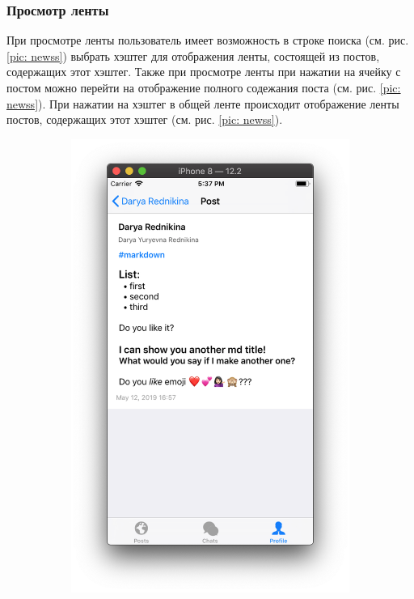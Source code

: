 \documentclass[a4paper,12pt]{article}
\begin{document}
	\subsubsection{Просмотр ленты}
	При просмотре ленты пользователь имеет возможность в строке поиска (см. рис. \ref{pic: newss}) выбрать хэштег для отображения ленты, состоящей из постов, содержащих этот хэштег. Также при просмотре ленты при нажатии на ячейку с постом можно перейти на отображение полного содежания поста (см. рис. \ref{pic: newss}).  При нажатии на хэштег в общей ленте происходит отображение ленты постов, содержащих этот хэштег (см. рис. \ref{pic: newss}).
	\begin{figure}[h!]
		\centering
		\begin{subfigure}[b]{0.3\linewidth}
			\includegraphics[width=\linewidth]{../includes/pmi/profile_fullpost.png}

\end{subfigure}
\end{figure}
\end{document}
